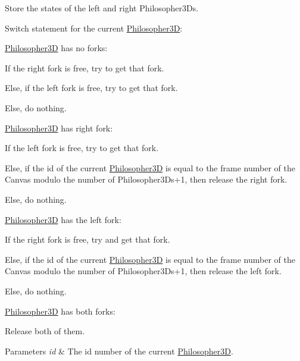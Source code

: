 \begin{DoxyItemize}
\item Store the states of the left and right Philosopher3\+Ds.
\item Switch statement for the current \hyperlink{class_philosopher3_d}{Philosopher3D}\+:
\begin{DoxyItemize}
\item \hyperlink{class_philosopher3_d}{Philosopher3D} has no forks\+:
\begin{DoxyItemize}
\item If the right fork is free, try to get that fork.
\item Else, if the left fork is free, try to get that fork.
\item Else, do nothing.
\end{DoxyItemize}
\item \hyperlink{class_philosopher3_d}{Philosopher3D} has right fork\+:
\begin{DoxyItemize}
\item If the left fork is free, try to get that fork.
\item Else, if the id of the current \hyperlink{class_philosopher3_d}{Philosopher3D} is equal to the frame number of the Canvas modulo the number of Philosopher3\+Ds+1, then release the right fork.
\item Else, do nothing.
\end{DoxyItemize}
\item \hyperlink{class_philosopher3_d}{Philosopher3D} has the left fork\+:
\begin{DoxyItemize}
\item If the right fork is free, try and get that fork.
\item Else, if the id of the current \hyperlink{class_philosopher3_d}{Philosopher3D} is equal to the frame number of the Canvas modulo the number of Philosopher3\+Ds+1, then release the left fork.
\item Else, do nothing.
\end{DoxyItemize}
\item \hyperlink{class_philosopher3_d}{Philosopher3D} has both forks\+:
\begin{DoxyItemize}
\item Release both of them.
\end{DoxyItemize}
\end{DoxyItemize}
\end{DoxyItemize}
\begin{DoxyParams}{Parameters}
{\em id} & The id number of the current \hyperlink{class_philosopher3_d}{Philosopher3D}. \\
\hline
\end{DoxyParams}


